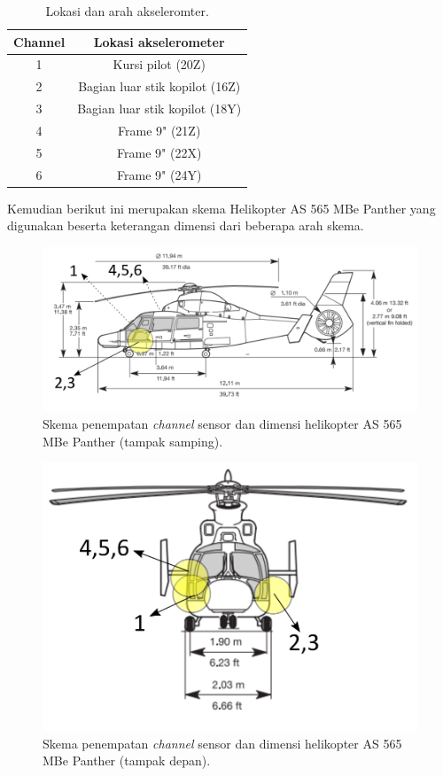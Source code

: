\begin{longtable}{|c|c|}
	\caption{Lokasi dan arah akseleromter.}
	\label{tb:lokasiakselero}                        	\\
	\hline
	\textbf{Channel} & \textbf{Lokasi akselerometer} 	\\
	\hline
	1            	 & Kursi pilot (20Z)             	\\
	\hline
	2			     & Bagian luar stik kopilot (16Z)   \\
	\hline
	3				 & Bagian luar stik kopilot	(18Y)   \\
	\hline
	4				 & Frame 9" (21Z)                   \\
	\hline
	5				 & Frame 9" (22X)					\\
	\hline
	6				 & Frame 9" (24Y)					\\
	\hline
\end{longtable}

Kemudian berikut ini merupakan skema Helikopter AS 565 MBe Panther yang digunakan beserta keterangan dimensi dari beberapa arah skema.

\begin{figure}[H]
	\centering
	\includegraphics[width=0.78\linewidth]{gambar/tampak_samping.png}
	\caption{Skema penempatan \textit{channel} sensor dan dimensi helikopter AS 565 MBe Panther (tampak samping).}
	\label{tampak_samping.png}
\end{figure}

\begin{figure}[H]
	\centering
	\includegraphics[width=0.6\linewidth]{gambar/tampak_depan.png}
	\caption{Skema penempatan \textit{channel} sensor dan dimensi helikopter AS 565 MBe Panther (tampak depan).}
	\label{tampak_depan.png}
\end{figure}

